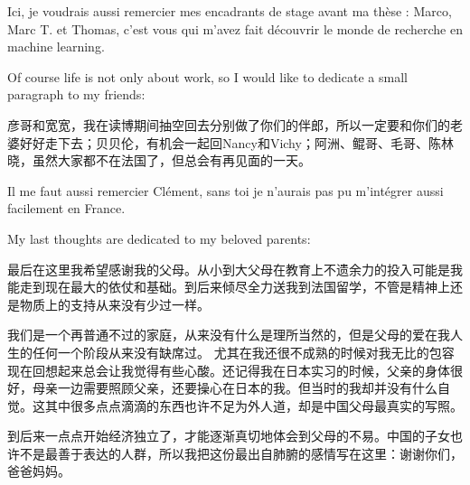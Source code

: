 Ici, je voudrais aussi remercier mes encadrants de stage avant ma th\`ese : Marco, Marc T. et Thomas, c'est vous qui m'avez fait d\'ecouvrir le monde de recherche en machine learning.

Of course life is not only about work, so I would like to dedicate a small paragraph to my friends: \begin{CJK*}{UTF8}{gbsn}彦哥和宽宽，我在读博期间抽空回去分别做了你们的伴郎，所以一定要和你们的老婆好好走下去；贝贝伦，有机会一起回Nancy和Vichy；阿洲、鲲哥、毛哥、陈林晓，虽然大家都不在法国了，但总会有再见面的一天。\end{CJK*} Il me faut aussi remercier Cl\'ement, sans toi je n'aurais pas pu m'int\'egrer aussi facilement en France.

My last thoughts are dedicated to my beloved parents:

\begin{CJK*}{UTF8}{gbsn}
	最后在这里我希望感谢我的父母。从小到大父母在教育上不遗余力的投入可能是我能走到现在最大的依仗和基础。到后来倾尽全力送我到法国留学，不管是精神上还是物质上的支持从来没有少过一样。
	
	我们是一个再普通不过的家庭，从来没有什么是理所当然的，但是父母的爱在我人生的任何一个阶段从来没有缺席过。 尤其在我还很不成熟的时候对我无比的包容现在回想起来总会让我觉得有些心酸。还记得我在日本实习的时候，父亲的身体很好，母亲一边需要照顾父亲，还要操心在日本的我。但当时的我却并没有什么自觉。这其中很多点点滴滴的东西也许不足为外人道，却是中国父母最真实的写照。
	
	到后来一点点开始经济独立了，才能逐渐真切地体会到父母的不易。中国的子女也许不是最善于表达的人群，所以我把这份最出自肺腑的感情写在这里：谢谢你们，爸爸妈妈。
\end{CJK*}



